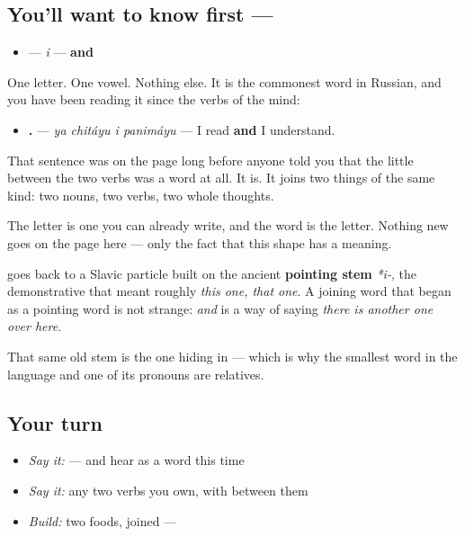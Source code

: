 \subsection*{You'll want to know first — }
\begin{itemize}
\raggedright
  \item \textbf{} — \emph{i} — \textbf{and}
\end{itemize}

One letter. One vowel. Nothing else. It is the commonest word in Russian, and you have been reading it since the verbs of the mind:

\begin{itemize}
\raggedright
  \item \textbf{   .} — \emph{ya chitáyu i panimáyu} — I read \textbf{and} I understand.
\end{itemize}

That sentence was on the page long before anyone told you that the little \textbf{} between the two verbs was a word at all. It is. It joins two things of the same kind: two nouns, two verbs, two whole thoughts.

The letter is one you can already write, and the word is the letter. Nothing new goes on the page here — only the fact that this shape has a meaning.

\begin{cousinweb}
\textbf{} goes back to a Slavic particle built on the ancient \textbf{pointing stem} \emph{*i-}, the demonstrative that meant roughly \emph{this one, that one}. A joining word that began as a pointing word is not strange: \emph{and} is a way of saying \emph{there is another one over here}.

That same old stem is the one hiding in \textbf{} — which is why the smallest word in the language and one of its pronouns are relatives.
\end{cousinweb}

\subsection*{Your turn}
\begin{itemize}
\raggedright
  \item \emph{Say it:} \emph{   } — and hear \textbf{} as a word this time
  \item \emph{Say it:} any two verbs you own, with \textbf{} between them
  \item \emph{Build:} two foods, joined — \emph{  }
\end{itemize}

